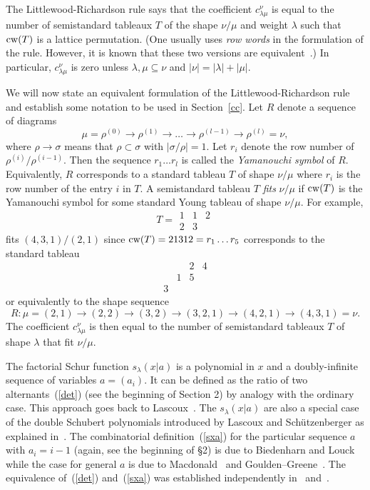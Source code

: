 \documentclass[titlepage,12pt]{article}
\newcommand{\barr}{\begin{array}}
\newcommand{\earr}{\end{array}}
\newcommand{\0}{{\bf 0}}
\newcommand{\1}{{\bf 1}}
\newcommand{\2}{{\bf 2}}
\newcommand{\3}{{\bf 3}}
\newcommand{\4}{{\bf 4}}
\newcommand{\5}{{\bf 5}}
\newcommand{\6}{{\bf 6}}
\newcommand{\7}{{\bf 7}}
\newcommand{\8}{{\bf 8}}
\newcommand{\9}{{\bf 9}}
\newcommand{\cw}{\mathop{\rm cw}}
\begin{document}
The Littlewood-Richardson rule says that the coefficient
$c_{\lambda\mu}^{\nu}$ is equal to the number of semistandard tableaux
$T$ of the shape $\nu/\mu$ and weight $\lambda$ such that $\cw(T)$ is
a lattice permutation. (One usually uses {\it row words} in the formulation
of the rule.
However, it is known that these two versions are equivalent~\cite{fg:lrm}.)
In particular, $c_{\lambda\mu}^{\nu}$ is zero unless
$\lambda,\mu\subseteq\nu$
and $|\nu|=|\lambda|+|\mu|$.


We will now state an equivalent formulation of the
Littlewood-Richardson rule~\cite{jp:sss,zel:glr,kr:bac} and establish
some notation to be used in Section~\ref{cc}.
Let $R$ denote a sequence of diagrams
$$
\mu=\rho^{(0)}\to\rho^{(1)}\to
\ldots\to\rho^{(l-1)}\to\rho^{(l)}=\nu,
$$
where $\rho\to\sigma$ means that $\rho\subset\sigma$ with
$|\sigma/\rho|=1$.
Let $r_i$ denote the row number of $\rho^{(i)}/\rho^{(i-1)}$.
Then the sequence $r_1\ldots r_l$ is called the {\it Yamanouchi
symbol} of $R$.  Equivalently, $R$ corresponds to a standard
tableau $T$ of shape $\nu/\mu$ where $r_i$ is the row number of the
entry $i$ in $T$.   A semistandard tableau $T$ {\it fits} $\nu/\mu$ if
$\cw(T)$ is the Yamanouchi symbol for some standard Young
tableau of shape $\nu/\mu$.  For example, 
$$
T=\barr{ccc} 	1&1&2\\
		2&3\earr
$$
fits $(4,3,1)/(2,1)$ since $\cw(T)=21312=r_1\ldots r_5$ corresponds to
the standard tableau
$$
\barr{cccc}	 & &2&4\\
		 &1&5\\
		3\earr
$$
or equivalently to the shape sequence
$$
R:\mu=(2,1)\to(2,2)\to(3,2)\to(3,2,1)\to(4,2,1)\to(4,3,1)=\nu.
$$
The coefficient
$c_{\lambda\mu}^{\nu}$ is then equal to the number of 
semistandard tableaux $T$ of shape $\lambda$ that fit $\nu/\mu$.

The factorial Schur function $s_{\lambda}(x|a)$ 
is a polynomial in $x$ and a doubly-infinite
sequence of variables $a=(a_i)$. 
It can be defined as the ratio of two alternants~(\ref{det}) (see the
beginning of Section 2) by
analogy with the ordinary case. 
This approach goes back to Lascoux~\cite{las:pe}.
The $s_{\lambda}(x|a)$ are also a special case of the double Schubert
polynomials introduced by Lascoux and Sch\"utzenberger as explained
in~\cite{las:i}. 
The combinatorial definition~(\ref{sxa}) for the particular sequence $a$
with $a_i=i-1$ (again, see the beginning of \S 2)
is due to Biedenharn and Louck~\cite{bl:ncs}
while the case for general $a$ is due to Macdonald~\cite{mac:sft} 
and Goulden--Greene~\cite{gg:ntr}.
The equivalence of~(\ref{det}) and~(\ref{sxa}) was established 
independently in~\cite{mac:sft} and~\cite{gg:ntr}.
\end{document}
